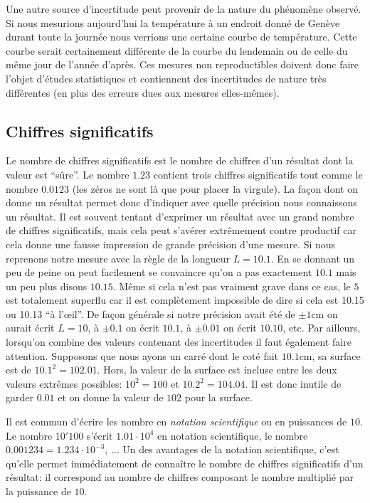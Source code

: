 \documentclass[a4paper,12pt]{book}
\newcommand{\cm}{\mathrm{cm}}
\begin{document}
Une autre source d'incertitude peut provenir de la nature du phénomène observé. Si nous mesurions aujourd'hui la température 
à un endroit donné de Genève durant toute la journée nous verrions une certaine courbe de température. Cette courbe serait certainement
différente de la courbe du lendemain ou de celle du même jour de l'année d'après. Ces mesures non reproductibles 
doivent donc faire l'objet d'études statistiques et contiennent des incertitudes de nature très différentes (en plus des erreurs dues aux mesures
elles-mêmes).

\subsection{Chiffres significatifs}

Le nombre de chiffres significatifs est le nombre de chiffres d'un résultat dont la valeur est ``sûre''. Le nombre $1.23$ contient trois chiffres 
significatifs tout comme le nombre $0.0123$ (les zéros ne sont là que pour placer la virgule). La façon dont on donne un résultat
permet donc d'indiquer avec quelle précision nous connaissons un résultat. Il est souvent tentant d'exprimer un résultat avec un grand nombre de chiffres
significatifs, mais cela peut s'avérer extrêmement contre productif car cela donne une fausse impression de grande précision d'une mesure.
Si nous reprenons notre mesure avec la règle de la longueur $L=10.1$. En se donnant un peu de peine on peut facilement se convaincre qu'on a
pas exactement $10.1$ mais un peu plus disons $10.15$. Même si cela n'est pas vraiment grave dans ce cas, le $5$ est totalement superflu
car il est complètement impossible de dire si cela est 10.15 ou 10.13 ``à l’œil''. De façon générale si notre précision avait été de $\pm 1\cm$
on aurait écrit $L=10$, à $\pm 0.1$ on écrit $10.1$, à $\pm 0.01$ on écrit $10.10$, etc. Par ailleurs, lorsqu’on combine des valeurs contenant
des incertitudes il faut également faire attention. Supposons que nous ayons un carré dont le coté fait $10.1\cm$, sa surface est de 
$10.1^2=102.01$. Hors, la valeur de la surface est incluse entre les deux valeurs extrêmes possibles: $10^2=100$ et $10.2^2=104.04$. Il est 
donc inutile de garder $0.01$ et on donne la valeur de $102$ pour la surface.

Il est commun d'écrire les nombre en \textit{notation scientifique} ou en puissances de $10$. Le nombre $10'100$ s'écrit $1.01\cdot 10^4$ en notation
scientifique, le nombre $0.001234=1.234\cdot 10^{-3}$, ... Un des avantages de la notation scientifique, c'est qu'elle permet immédiatement de connaître le nombre de chiffres
significatifs d'un résultat: il correspond au nombre de chiffres composant le nombre multiplié par la puissance de $10$.
\end{document}
